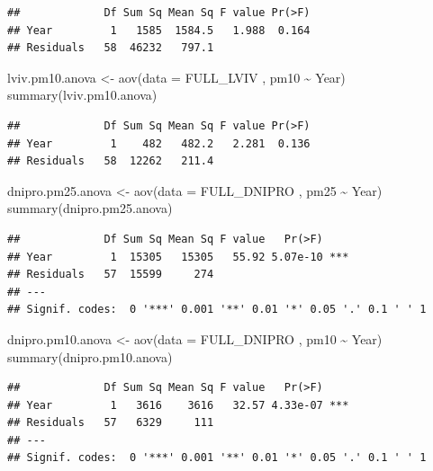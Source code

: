 \documentclass[
  12pt,
]{article}
\newenvironment{Shaded}{\begin{snugshade}}{\end{snugshade}}
\newcommand{\AttributeTok}[1]{\textcolor[rgb]{0.77,0.63,0.00}{#1}}
\newcommand{\FunctionTok}[1]{\textcolor[rgb]{0.00,0.00,0.00}{#1}}
\newcommand{\NormalTok}[1]{#1}
\newcommand{\OtherTok}[1]{\textcolor[rgb]{0.56,0.35,0.01}{#1}}
\newcommand{\SpecialCharTok}[1]{\textcolor[rgb]{0.00,0.00,0.00}{#1}}
\begin{document}
\begin{verbatim}
##             Df Sum Sq Mean Sq F value Pr(>F)
## Year         1   1585  1584.5   1.988  0.164
## Residuals   58  46232   797.1
\end{verbatim}

\begin{Shaded}
\begin{Highlighting}[]
\NormalTok{lviv.pm10.anova }\OtherTok{\textless{}{-}} \FunctionTok{aov}\NormalTok{(}\AttributeTok{data =}\NormalTok{ FULL\_LVIV , pm10 }\SpecialCharTok{\textasciitilde{}}\NormalTok{ Year)}
\FunctionTok{summary}\NormalTok{(lviv.pm10.anova)}
\end{Highlighting}
\end{Shaded}

\begin{verbatim}
##             Df Sum Sq Mean Sq F value Pr(>F)
## Year         1    482   482.2   2.281  0.136
## Residuals   58  12262   211.4
\end{verbatim}

\begin{Shaded}
\begin{Highlighting}[]
\NormalTok{dnipro.pm25.anova }\OtherTok{\textless{}{-}} \FunctionTok{aov}\NormalTok{(}\AttributeTok{data =}\NormalTok{ FULL\_DNIPRO , pm25 }\SpecialCharTok{\textasciitilde{}}\NormalTok{ Year)}
\FunctionTok{summary}\NormalTok{(dnipro.pm25.anova)}
\end{Highlighting}
\end{Shaded}

\begin{verbatim}
##             Df Sum Sq Mean Sq F value   Pr(>F)    
## Year         1  15305   15305   55.92 5.07e-10 ***
## Residuals   57  15599     274                     
## ---
## Signif. codes:  0 '***' 0.001 '**' 0.01 '*' 0.05 '.' 0.1 ' ' 1
\end{verbatim}

\begin{Shaded}
\begin{Highlighting}[]
\NormalTok{dnipro.pm10.anova }\OtherTok{\textless{}{-}} \FunctionTok{aov}\NormalTok{(}\AttributeTok{data =}\NormalTok{ FULL\_DNIPRO , pm10 }\SpecialCharTok{\textasciitilde{}}\NormalTok{ Year)}
\FunctionTok{summary}\NormalTok{(dnipro.pm10.anova)}
\end{Highlighting}
\end{Shaded}

\begin{verbatim}
##             Df Sum Sq Mean Sq F value   Pr(>F)    
## Year         1   3616    3616   32.57 4.33e-07 ***
## Residuals   57   6329     111                     
## ---
## Signif. codes:  0 '***' 0.001 '**' 0.01 '*' 0.05 '.' 0.1 ' ' 1
\end{verbatim}
\end{document}
